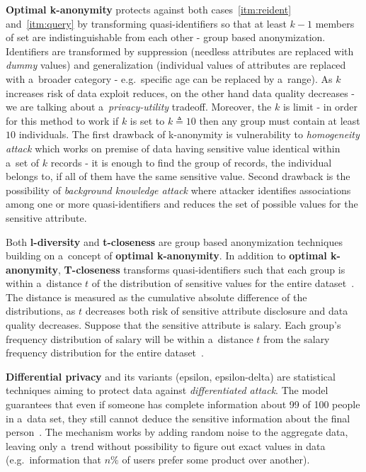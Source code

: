 \textbf{Optimal k-anonymity} protects against both cases~\ref{itm:reident} and~\ref{itm:query} by transforming quasi-identifiers so that at least \( k - 1 \) members of set are indistinguishable from each other - group based anonymization.
Identifiers are transformed by suppression (needless attributes are replaced with \textit{dummy} values) and generalization (individual values of attributes are replaced with a~broader category - e.g.\ specific age can be replaced by a~range).
As \( k \) increases risk of data exploit reduces, on the other hand data quality decreases - we are talking about a~\textit{privacy-utility} tradeoff.
Moreover, the \( k \) is limit - in order for this method to work if \( k \) is set to \( k \triangleq 10 \) then any group must contain at least \( 10 \) individuals.
The first drawback of k-anonymity is vulnerability to \textit{homogeneity attack} which works on premise of data having sensitive value identical within a~set of \( k \) records - it is enough to find the group of records, the individual belongs to, if all of them have the same sensitive value.
Second drawback is the possibility of \textit{background knowledge attack} where attacker identifies associations among one or more quasi-identifiers and reduces the set of possible values for the sensitive attribute.

Both \textbf{l-diversity} and \textbf{t-closeness} are group based anonymization techniques building on a~concept of \textbf{optimal k-anonymity}.
In addition to \textbf{optimal k-anonymity}, \textbf{T-closeness} transforms quasi-identifiers such that each group is within a~distance \( t \) of the distribution of sensitive values for the entire dataset~\cite{web:privacy-models}.
The distance is measured as the cumulative absolute difference of the distributions, as \( t \) decreases both risk of sensitive attribute disclosure and data quality decreases.
Suppose that the sensitive attribute is salary.
Each group's frequency distribution of salary will be within a~distance \( t \) from the salary frequency distribution for the entire dataset~\cite{web:privacy-models}.

\textbf{Differential privacy} and its variants (epsilon, epsilon-delta) are statistical techniques aiming to protect data against \textit{differentiated attack}.
The model guarantees that even if someone has complete information about 99 of 100 people in a~data set, they still cannot deduce the sensitive information about the final person~\cite{web:differential-privacy}.
The mechanism works by adding random noise to the aggregate data, leaving only a~trend without possibility to figure out exact values in data (e.g.\ information that \( n\% \) of users prefer some product over another).

